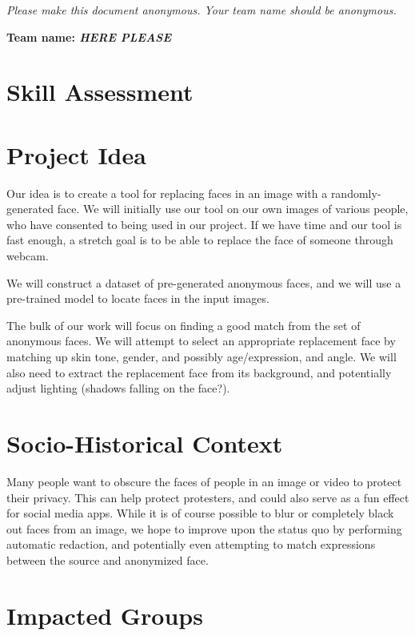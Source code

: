 \emph{Please make this document anonymous. Your team name should be anonymous.}

\textbf{Team name: \emph{HERE PLEASE}}

\section*{Skill Assessment}



\section*{Project Idea}

Our idea is to create a tool for replacing faces in an image with a randomly-generated face. We will initially use our tool on our own images of various people, who have consented to being used in our project. If we have time and our tool is fast enough, a stretch goal is to be able to replace the face of someone through webcam.

We will construct a dataset of pre-generated anonymous faces, and we will use a pre-trained model to locate faces in the input images.

The bulk of our work will focus on finding a good match from the set of anonymous faces. We will attempt to select an appropriate replacement face by matching up skin tone, gender, and possibly age/expression, and angle. We will also need to extract the replacement face from its background, and potentially adjust lighting (shadows falling on the face?).

\section*{Socio-Historical Context}

Many people want to obscure the faces of people in an image or video to protect their privacy. This can help protect protesters, and could also serve as a fun effect for social media apps. While it is of course possible to blur or completely black out faces from an image, we hope to improve upon the status quo by performing automatic redaction, and potentially even attempting to match expressions between the source and anonymized face.

\section*{Impacted Groups}



